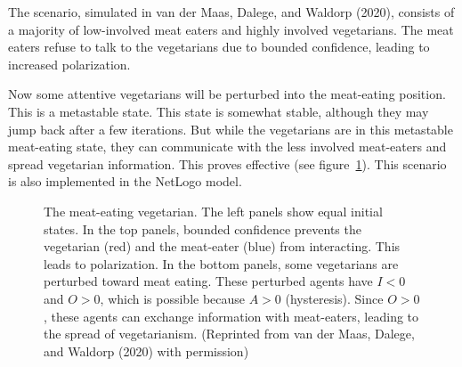 \documentclass[
  a4paper,
  DIV=11,
  numbers=noendperiod,
  oneside]{scrreprt}
\begin{document}
The scenario, simulated in van der Maas, Dalege, and Waldorp (2020),
consists of a majority of low-involved meat eaters and highly involved
vegetarians. The meat eaters refuse to talk to the vegetarians due to
bounded confidence, leading to increased polarization.

Now some attentive vegetarians will be perturbed into the meat-eating
position. This is a metastable state. This state is somewhat stable,
although they may jump back after a few iterations. But while the
vegetarians are in this metastable meat-eating state, they can
communicate with the less involved meat-eaters and spread vegetarian
information. This proves effective (see
figure~\ref{fig-ch7-img12-old-100}). This scenario is also implemented
in the NetLogo model.

\begin{figure}


\caption{\label{fig-ch7-img12-old-100}The meat-eating vegetarian. The
left panels show equal initial states. In the top panels, bounded
confidence prevents the vegetarian (red) and the meat-eater (blue) from
interacting. This leads to polarization. In the bottom panels, some
vegetarians are perturbed toward meat eating. These perturbed agents
have \(I < 0\) and \(O > 0\), which is possible because \(A > 0\)
(hysteresis). Since \(O > 0\), these agents can exchange information
with meat-eaters, leading to the spread of vegetarianism. (Reprinted
from van der Maas, Dalege, and Waldorp (2020) with permission)}

\end{figure}%
\end{document}
